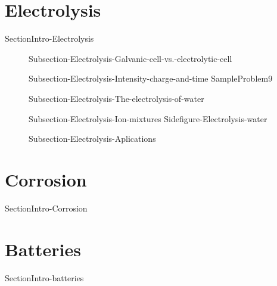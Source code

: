 \documentclass[main.tex]{subfiles}
\newcommand\chapterlabel{Ch-electrochem}\setcounter{figurenewcounter}{0}\setcounter{tablenewcounter}{0}\setcounter{formulanewcounter}{0}\chapterpicture{../{\chapterlabel}/figure1}\chapterpicturelabel{PxFuel}
\begin{document}
 \section{Electrolysis}{SectionIntro-Electrolysis}
\sloppy\begin{description}
    \item[] {Subsection-Electrolysis-Galvanic-cell-vs.-electrolytic-cell}
     \item[] {Subsection-Electrolysis-Intensity-charge-and-time}
     {SampleProblem9}

     \item[] {Subsection-Electrolysis-The-electrolysis-of-water}
     \item[] {Subsection-Electrolysis-Ion-mixtures}
     {Sidefigure-Electrolysis-water}

     \item[] {Subsection-Electrolysis-Aplications}
 
\end{description}


 \section{Corrosion}{SectionIntro-Corrosion}
 \section{Batteries}{SectionIntro-batteries}







\checkoddpage\ifoddpage \clearpage\thispagestyle{empty}\mbox{}\clearpage \else  \fi 
\end{document}

